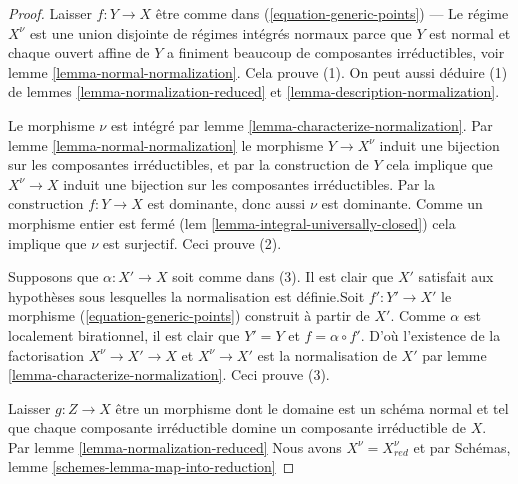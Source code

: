 \begin{proof}

Laisser $f : Y \to X$ être comme dans (\ref{equation-generic-points}) — Le régime $X^\nu$ est une union disjointe de régimes intégrés normaux parce que $Y$ est normal et chaque ouvert affine de $Y$ a finiment beaucoup de composantes irréductibles, voir lemme \ref{lemma-normal-normalization}. Cela prouve (1). On peut aussi déduire (1) de lemmes \ref{lemma-normalization-reduced} et
\ref{lemma-description-normalization}.

\medskip\noindent
Le morphisme $\nu$ est intégré par lemme \ref{lemma-characterize-normalization}. Par lemme \ref{lemma-normal-normalization} le morphisme $Y \to X^\nu$ induit une bijection sur les composantes irréductibles, et par la construction de $Y$ cela implique que $X^\nu \to X$ induit une bijection sur les composantes irréductibles. Par la construction $f : Y \to X$ est dominante, donc aussi $\nu$ est dominante. Comme un morphisme entier est fermé (lem \ref{lemma-integral-universally-closed}) cela implique que $\nu$ est surjectif. Ceci prouve (2).

\medskip\noindent
Supposons que $\alpha : X' \to X$ soit comme dans (3). Il est clair que $X'$ satisfait aux hypothèses sous lesquelles la normalisation est définie.Soit $f' : Y' \to X'$ le morphisme (\ref{equation-generic-points}) construit à partir de $X'$. Comme $\alpha$ est localement birationnel, il est clair que $Y' = Y$ et $f = \alpha \circ f'$. D'où l'existence de la factorisation $X^\nu \to X' \to X$ et $X^\nu \to X'$ est la normalisation de $X'$ par lemme \ref{lemma-characterize-normalization}. Ceci prouve (3).

\medskip\noindent

Laisser $g : Z \to X$ être un morphisme dont le domaine est un schéma normal et tel que chaque composante irréductible domine un composante irréductible de $X$. Par lemme \ref{lemma-normalization-reduced}
Nous avons $X^\nu = X_{red}^\nu$ et par Schémas, lemme \ref{schemes-lemma-map-into-reduction}


\end{proof}

